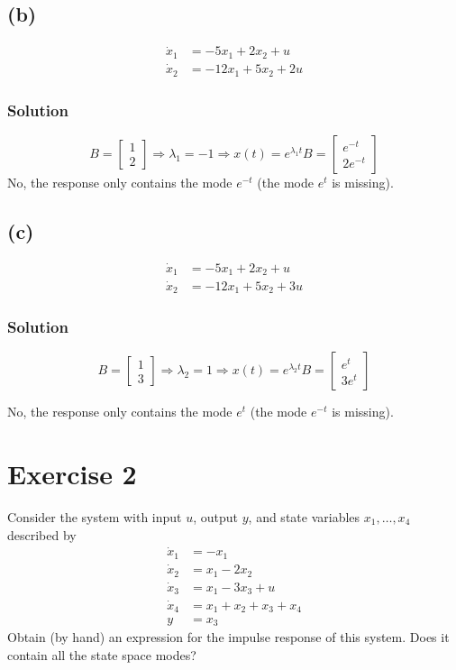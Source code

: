 \documentclass[12pt,a4paper]{article}
\begin{document}
	\subsection*{(b)}
	\begin{align*}
		\dot{x}_{1} &= -5x_{1}+2x_{2}+u \\
		\dot{x}_{2} &= -12x_{1}+5x_{2}+2u
	\end{align*}
	
	\subsubsection*{Solution}
	
	\[
	B = \begin{bmatrix}
		1 \\ 2
	\end{bmatrix} \Rightarrow \lambda_1 = -1 \Rightarrow x(t) = e^{\lambda_1 t} B = \begin{bmatrix}
	e^{-t} \\ 2e^{-t}
	\end{bmatrix}
	\]
	No, the response only contains the mode $e^{-t}$ (the mode $e^t$ is missing).
	\subsection*{(c)}
	\begin{align*}
		\dot{x}_{1} &= -5x_{1}+2x_{2}+u \\
		\dot{x}_{2} &= -12x_{1}+5x_{2}+3u
	\end{align*}
	
	\subsubsection*{Solution}
	
	\[
	B = \begin{bmatrix}
		1 \\ 3
	\end{bmatrix} \Rightarrow \lambda_2 = 1 \Rightarrow x(t) = e^{\lambda_2 t} B = \begin{bmatrix}
	e^{t} \\ 3e^{t}
	\end{bmatrix}
	\]
	
	No, the response only contains the mode $e^{t}$ (the mode $e^{-t}$ is missing).
	\section*{Exercise 2}
	Consider the system with input $u$, output $y$, and state variables $x_{1},\dots,x_{4}$ described by
	\begin{align*}
		\dot{x}_{1} &= -x_{1} \\
		\dot{x}_{2} &= x_{1}-2x_{2} \\
		\dot{x}_{3} &= x_{1}-3x_{3}+u \\
		\dot{x}_{4} &= x_{1}+x_{2}+x_{3}+x_{4} \\
		y &= x_{3}
	\end{align*}
	Obtain (by hand) an expression for the impulse response of this system. Does it contain all the state space modes?
	
\end{document}
